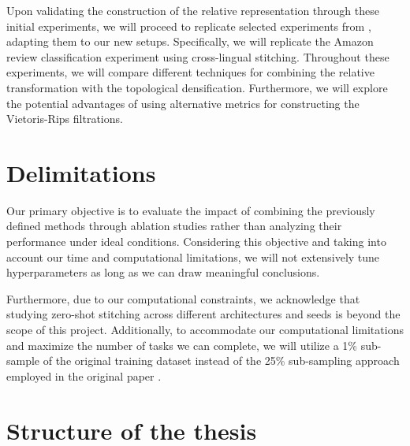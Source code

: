 \documentclass[../main.tex]{subfiles}
\begin{document}
Upon validating the construction of the relative representation through these initial experiments, we will proceed to replicate selected experiments from \cite{moschella_relative_2022}, adapting them to our new setups. Specifically, we will replicate the Amazon review classification experiment using cross-lingual stitching. Throughout these experiments, we will compare different techniques for combining the relative transformation with the topological densification. Furthermore, we will explore the potential advantages of using alternative metrics for constructing the Vietoris-Rips filtrations.

\section{Delimitations}
Our primary objective is to evaluate the impact of combining the previously defined methods through ablation studies rather than analyzing their performance under ideal conditions. Considering this objective and taking into account our time and computational limitations, we will not extensively tune hyperparameters as long as we can draw meaningful conclusions.


Furthermore, due to our computational constraints, we acknowledge that studying zero-shot stitching across different architectures and seeds is beyond the scope of this project. Additionally, to accommodate our computational limitations and maximize the number of tasks we can complete, we will utilize a 1\% sub-sample of the original training dataset instead of the 25\% sub-sampling approach employed in the original paper \cite{moschella_relative_2022}.


\section{Structure of the thesis}
\end{document}
